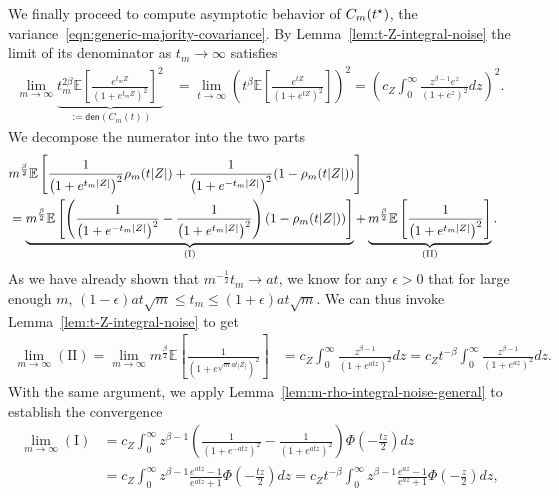 \documentclass[11pt]{article}
\newcommand{\Ep}{\mathbb{E}}
\newcommand{\<}{\langle} %
\renewcommand{\>}{\rangle}
\newcommand{\opt}{^\star}
\begin{document}
We finally proceed to compute asymptotic behavior of $\varfunc(t\opt)$, the
variance~\eqref{eqn:generic-majority-covariance}. By
Lemma~\ref{lem:t-Z-integral-noise} the limit of its denominator as $t_m \to
\infty$ satisfies
\begin{align*}
  \lim_{m \to \infty}
  \underbrace{t_m^{2 \beta}
    \Ep\left[\frac{e^{t_m Z} }{ (1 + e^{t_m Z})^2}\right]^2}_{
    :=\mathsf{den}(C_m(t))}
  & = \lim_{t \to \infty} \left( t^\beta \Ep\left[\frac{e^{t Z} }{ (1 + e^{t Z})^2}\right]\right)^2 =
  \left(c_Z\int_{0}^\infty \frac{z^{\beta - 1} e^{z} }{ (1 + e^{z})^2} dz\right)^2.
\end{align*}
We decompose the numerator into the two parts
\begin{align*}
  \lefteqn{m^{\frac{\beta}{2}} \Ep \left[\frac{1}{\left(1 + e^{t_m|Z|}\right)^2} \rho_m(t |Z|) + \frac{1}{\left(1 + e^{-t_m|Z|}\right)^2} (1-\rho_m(t|Z|)) \right]} \nonumber \\
  & = \underbrace{m^{\frac{\beta}{2}} \Ep \left[\left(\frac{1}{\left(1 + e^{-t_m|Z|}\right)^2} - \frac{1}{\left(1 + e^{t_m|Z|}\right)^2} \right)(1-\rho_m(t|Z|)) \right]}_{\mathrm{(I)}} + \underbrace{m^{\frac{\beta}{2}} \Ep \left[\frac{1}{\left(1 + e^{t_m|Z|}\right)^2}\right]}_{\mathrm{(II)}}  .
\end{align*}
As we have already shown that $m^{-\frac{1}{2}} t_m \to at$, we know for any
$\epsilon > 0$ that for large enough $m$, $(1-\epsilon) a t \sqrt m
\leq t_m \leq (1 +\epsilon) at \sqrt{m}$. We can thus invoke
Lemma~\ref{lem:t-Z-integral-noise} to get
\begin{align*}
  \lim_{m \to \infty}  \mathrm{(II)} = \lim_{m \to \infty} m^{\frac \beta 2} \Ep \left[\frac{1}{\left(1 + e^{\sqrt m at|Z|}\right)^2}\right] &  = c_Z \int_0^\infty  \frac{z^{\beta - 1}}{\left(1 + e^{a t z}\right)^2} dz  = c_Z {t}^{-\beta} \int_0^\infty \frac{z^{\beta - 1}}{\left(1 + e^{a z}\right)^2} dz  . %
\end{align*}
With the same argument, we apply Lemma~\ref{lem:m-rho-integral-noise-general}
to establish the convergence
\begin{align*}
  \lim_{m \to \infty} \mathrm{(I)} 
  & = c_Z \int_0^\infty z^{\beta - 1}\left(\frac{1}{\left(1 + e^{-a tz}\right)^2} - \frac{1}{\left(1 + e^{a t z}\right)^2} \right) \Phi \left(-\frac{tz}{2}\right) dz \\
  & = c_Z \int_0^\infty z^{\beta - 1}\frac{e^{a tz} - 1}{e^{a t z} + 1} \Phi \left(-\frac{tz}{2}\right) dz
  = c_Z {t}^{-\beta} \int_0^\infty z^{\beta - 1}\frac{e^{a z} - 1}{e^{a z} + 1} \Phi \left(-\frac{z}{2}\right) dz    , %
\end{align*}
\end{document}
